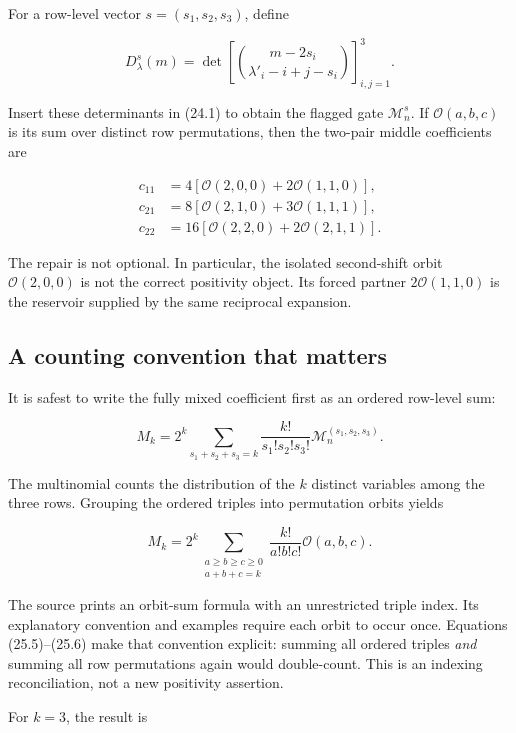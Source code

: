 \documentclass[
  10pt,
  a4paper,
  10pt,
  oneside,
  openany]{book}
\begin{document}
For a row-level vector \(s=(s_1,s_2,s_3)\), define

\[
 D_\lambda^s(m)=
 \det\left[\binom{m-2s_i}{\lambda'_i-i+j-s_i}\right]_{i,j=1}^3.
 \tag{25.3}\label{eq:25.3}
\]

Insert these determinants in (24.1) to obtain the flagged gate
\(\mathcal M_n^s\). If \(\mathcal O(a,b,c)\) is its sum over distinct
row permutations, then the two-pair middle coefficients are

\[
\begin{aligned}
 c_{11}&=4[\mathcal O(2,0,0)+2\mathcal O(1,1,0)],\\
 c_{21}&=8[\mathcal O(2,1,0)+3\mathcal O(1,1,1)],\\
 c_{22}&=16[\mathcal O(2,2,0)+2\mathcal O(2,1,1)].
\end{aligned}
 \tag{25.4}\label{eq:25.4}
\]

The repair is not optional. In particular, the isolated second-shift
orbit \(\mathcal O(2,0,0)\) is not the correct positivity object. Its
forced partner \(2\mathcal O(1,1,0)\) is the reservoir supplied by the
same reciprocal expansion.

\subsection{A counting convention that
matters}\label{a-counting-convention-that-matters}

It is safest to write the fully mixed coefficient first as an ordered
row-level sum:

\[
 M_k=2^k\sum_{s_1+s_2+s_3=k}
 \frac{k!}{s_1!s_2!s_3!}\mathcal M_n^{(s_1,s_2,s_3)}.
 \tag{25.5}\label{eq:25.5}
\]

The multinomial counts the distribution of the \(k\) distinct variables
among the three rows. Grouping the ordered triples into permutation
orbits yields

\[
 M_k=2^k\sum_{\substack{a\ge b\ge c\ge0\\a+b+c=k}}
 \frac{k!}{a!b!c!}\mathcal O(a,b,c).
 \tag{25.6}\label{eq:25.6}
\]

The source prints an orbit-sum formula with an unrestricted triple
index. Its explanatory convention and examples require each orbit to
occur once. Equations (25.5)--(25.6) make that convention explicit:
summing all ordered triples \emph{and} summing all row permutations
again would double-count. This is an indexing reconciliation, not a new
positivity assertion.

For \(k=3\), the result is
\end{document}
